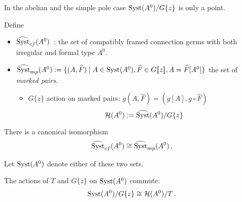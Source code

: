 \begin{rem}
  In the abelian and the simple pole case $\operatorname{Syst}(A^0)/G\{z\}$ is only a point.
\end{rem}
\begin{defn} Define
  \begin{itemize}
    \item $\widehat{\operatorname{Syst}}_{cf}(A^0)$~:\Leftrightarrow{} the set of compatibly
      framed connection germs with both irregular and formal type $A^0$.
    \item $\widehat{\operatorname{Syst}}_{mp}(A^0):=\{(A,\widehat{F})\mid A\in\operatorname{Syst}(A^0)
      ,\widehat{F}\in G\llbracket z\rrbracket
      ,A=\widehat{F}[A^0]\}$
      the set of \emph{marked pairs}.
      \begin{itemize}
        \item $G\{z\}$ action on marked pairs:
          $g(A,\hat{F})=(g[A],g\circ\hat{F})$
          \[
            \mathcal{H}(A^0):=\widehat{\operatorname{Syst}}(A^0)/G\{z\}
          \]
      \end{itemize}
  \end{itemize}

  \begin{lem}
    There is a canonical isomorphism
    \[
      \widehat{\operatorname{Syst}}_{cf}(A^0)\cong\widehat{\operatorname{Syst}}_{mp}(A^0) \,,
    \]
  \end{lem}
  Let $\operatorname{Syst}(A^0)$ denote either of these two sets.
\end{defn}
\begin{lem}
The actions of $T$ and $G\{z\}$ on $\operatorname{Syst}(A^0)$ commute:
\[
  \operatorname{Syst}(A^0)/G\{z\}\cong\mathcal{H}(A^0)/T \,.
\]
\end{lem}

